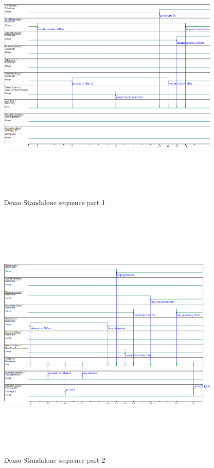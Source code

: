 \documentclass[12pt]{report}%
\begin{document}
\begin{figure}[ht]
	\centering
	\includegraphics[width=\textwidth, height=13cm]{timing_1}
  	\caption{Demo Standalone sequence part 1}
  	\label{fig:timing1}
\end{figure}

\begin{figure}[h]
	\centering
	\includegraphics[width=\textwidth, height=13cm]{timing_2}
  	\caption{Demo Standalone sequence part 2}
  	\label{fig:timing2}
\end{figure}
\end{document}
